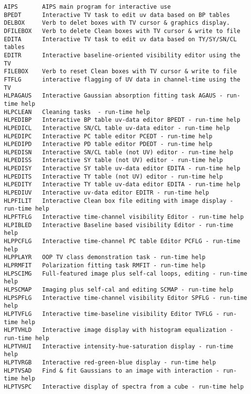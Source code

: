 
\vskip 0.5pt
\bbve\begin{verbatim}
AIPS       AIPS main program for interactive use
BPEDT      Interactive TV task to edit uv data based on BP tables
DELBOX     Verb to delet boxes with TV cursor & graphics display.
DFILEBOX   Verb to delete Clean boxes with TV cursor & write to file
EDITA      Interactive TV task to edit uv data based on TY/SY/SN/CL tables
EDITR      Interactive baseline-oriented visibility editor using the TV
FILEBOX    Verb to reset Clean boxes with TV cursor & write to file
FTFLG      interactive flagging of UV data in channel-time using the TV
HLPAGAUS   Interactive Gaussian absorption fitting task AGAUS - run-time help
HLPCLEAN   Cleaning tasks  - run-time help
HLPEDIBP   Interactive BP table uv-data editor BPEDT - run-time help
HLPEDICL   Interactive SN/CL table uv-data editor - run-time help
HLPEDIPC   Interactive PC table editor PCEDT - run-time help
HLPEDIPD   Interactive PD table editor PDEDT - run-time help
HLPEDISN   Interactive SN/CL table (not UV) editor - run-time help
HLPEDISS   Interactive SY table (not UV) editor - run-time help
HLPEDISY   Interactive SY table uv-data editor EDITA - run-time help
HLPEDITS   Interactive TY table (not UV) editor - run-time help
HLPEDITY   Interactive TY table uv-data editor EDITA - run-time help
HLPEDIUV   Interactive uv-data editor EDITR - run-time help
HLPFILIT   Interactive Clean box file editing with image display - run-time help
HLPFTFLG   Interactive time-channel visibility Editor - run-time help
HLPIBLED   Interactive Baseline based visibility Editor - run-time help
HLPPCFLG   Interactive time-channel PC table Editor PCFLG - run-time help
HLPPLAYR   OOP TV class demonstration task - run-time help
HLPRMFIT   Polarization fitting task RMFIT - run-time help
HLPSCIMG   Full-featured image plus self-cal loops, editing - run-time help
HLPSCMAP   Imaging plus self-cal and editing SCMAP - run-time help
HLPSPFLG   Interactive time-channel visibility Editor SPFLG - run-time help
HLPTVFLG   Interactive time-baseline visibility Editor TVFLG - run-time help
HLPTVHLD   Interactive image display with histogram equalization - run-time help
HLPTVHUI   Interactive intensity-hue-saturation display - run-time help
HLPTVRGB   Interactive red-green-blue display - run-time help
HLPTVSAD   Find & fit Gaussians to an image with interaction - run-time help
HLPTVSPC   Interactive display of spectra from a cube - run-time help

\end{verbatim}
